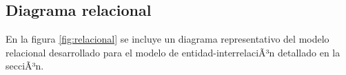 \documentclass[a4paper,11pt]{article}
\begin{document}
%
%
%
%
%
%
%
%
%
%
%
%
%
%
%
%
%
%

\newpage

\subsection{Diagrama relacional}

 En la figura \ref{fig:relacional} se incluye un diagrama representativo del
 modelo relacional desarrollado para el modelo de entidad-interrelaciÃ³n
 detallado en la secciÃ³n.
\end{document}
